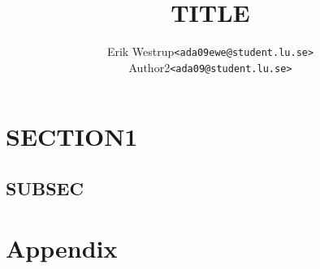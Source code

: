 \documentclass[10pt, a4paper]{article}
\title{TITLE}
\author{
		\begin{tabular}{l l}
				Erik Westrup & \texttt{<ada09ewe@student.lu.se>}\\
				Author2 & \texttt{<ada09@student.lu.se>}
		\end{tabular}
}
\begin{document}
\begin{titlepage}
\maketitle
\thispagestyle{empty}	%
\end{titlepage}

\section{SECTION1}
\lipsum[1-3]

\subsection{SUBSEC}
\lipsum[1]
\emph{\cite{dummy:ref}}





\newpage
\section*{Appendix}
\appendix
\end{document}
